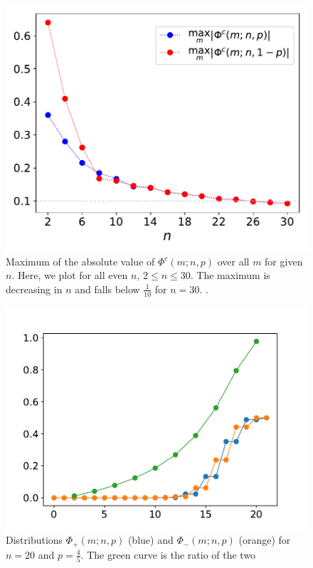 \documentclass[pra,
aps,
twocolumn,
superscriptaddress,
groupedaddress,
nofootinbib,
reprint
]{revtex4-1}
\begin{document}
\begin{figure}
    \centering
    \includegraphics[scale=0.5]{figs/Phic_max.pdf}
    \caption{Maximum of the absolute value of $\Phi^c(m;n,p)$ over all $m$ for given $n$.
    Here, we plot for all even $n$, $2\leq n\leq 30$.
    The maximum is decreasing in $n$ and falls below $\frac{1}{10}$ for $n=30$.
    .
    }
    \label{fig:phicmax}
\end{figure}

\begin{figure}
    \centering
    \includegraphics[scale=0.5]{figs/Phi_ratio.pdf}
    \caption{Distributions $\Phi_+(m;n,p)$ (blue) and $\Phi_-(m;n,p)$ (orange) for $n=20$ and $p=\frac{4}{5}$.
    The green curve is the ratio of the two
    }
    \label{fig:Phi_ratio}
\end{figure}
\end{document}
